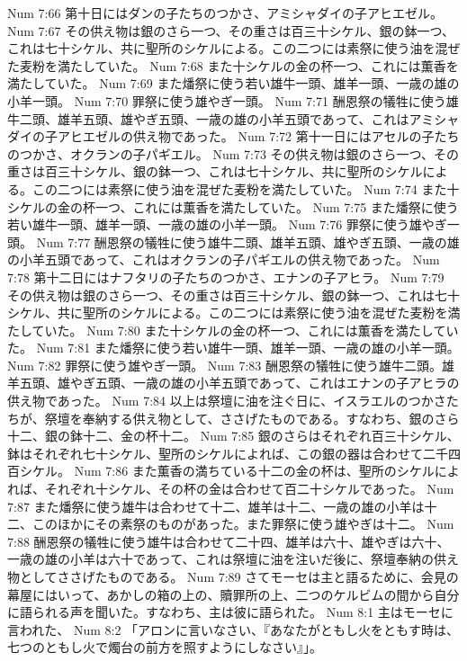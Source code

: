 Num 7:66  第十日にはダンの子たちのつかさ、アミシャダイの子アヒエゼル。
Num 7:67  その供え物は銀のさら一つ、その重さは百三十シケル、銀の鉢一つ、これは七十シケル、共に聖所のシケルによる。この二つには素祭に使う油を混ぜた麦粉を満たしていた。
Num 7:68  また十シケルの金の杯一つ、これには薫香を満たしていた。
Num 7:69  また燔祭に使う若い雄牛一頭、雄羊一頭、一歳の雄の小羊一頭。
Num 7:70  罪祭に使う雄やぎ一頭。
Num 7:71  酬恩祭の犠牲に使う雄牛二頭、雄羊五頭、雄やぎ五頭、一歳の雄の小羊五頭であって、これはアミシャダイの子アヒエゼルの供え物であった。
Num 7:72  第十一日にはアセルの子たちのつかさ、オクランの子パギエル。
Num 7:73  その供え物は銀のさら一つ、その重さは百三十シケル、銀の鉢一つ、これは七十シケル、共に聖所のシケルによる。この二つには素祭に使う油を混ぜた麦粉を満たしていた。
Num 7:74  また十シケルの金の杯一つ、これには薫香を満たしていた。
Num 7:75  また燔祭に使う若い雄牛一頭、雄羊一頭、一歳の雄の小羊一頭。
Num 7:76  罪祭に使う雄やぎ一頭。
Num 7:77  酬恩祭の犠牲に使う雄牛二頭、雄羊五頭、雄やぎ五頭、一歳の雄の小羊五頭であって、これはオクランの子パギエルの供え物であった。
Num 7:78  第十二日にはナフタリの子たちのつかさ、エナンの子アヒラ。
Num 7:79  その供え物は銀のさら一つ、その重さは百三十シケル、銀の鉢一つ、これは七十シケル、共に聖所のシケルによる。この二つには素祭に使う油を混ぜた麦粉を満たしていた。
Num 7:80  また十シケルの金の杯一つ、これには薫香を満たしていた。
Num 7:81  また燔祭に使う若い雄牛一頭、雄羊一頭、一歳の雄の小羊一頭。
Num 7:82  罪祭に使う雄やぎ一頭。
Num 7:83  酬恩祭の犠牲に使う雄牛二頭。雄羊五頭、雄やぎ五頭、一歳の雄の小羊五頭であって、これはエナンの子アヒラの供え物であった。
Num 7:84  以上は祭壇に油を注ぐ日に、イスラエルのつかさたちが、祭壇を奉納する供え物として、ささげたものである。すなわち、銀のさら十二、銀の鉢十二、金の杯十二。
Num 7:85  銀のさらはそれぞれ百三十シケル、鉢はそれぞれ七十シケル、聖所のシケルによれば、この銀の器は合わせて二千四百シケル。
Num 7:86  また薫香の満ちている十二の金の杯は、聖所のシケルによれば、それぞれ十シケル、その杯の金は合わせて百二十シケルであった。
Num 7:87  また燔祭に使う雄牛は合わせて十二、雄羊は十二、一歳の雄の小羊は十二、このほかにその素祭のものがあった。また罪祭に使う雄やぎは十二。
Num 7:88  酬恩祭の犠牲に使う雄牛は合わせて二十四、雄羊は六十、雄やぎは六十、一歳の雄の小羊は六十であって、これは祭壇に油を注いだ後に、祭壇奉納の供え物としてささげたものである。
Num 7:89  さてモーセは主と語るために、会見の幕屋にはいって、あかしの箱の上の、贖罪所の上、二つのケルビムの間から自分に語られる声を聞いた。すなわち、主は彼に語られた。
Num 8:1  主はモーセに言われた、
Num 8:2  「アロンに言いなさい、『あなたがともし火をともす時は、七つのともし火で燭台の前方を照すようにしなさい』」。
